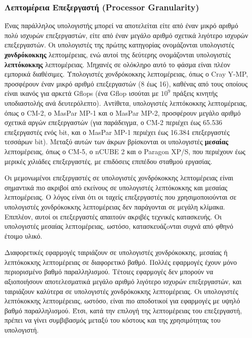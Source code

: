 \documentclass[12pt,a4paper]{article} %
\begin{document}
\subsubsection{Λεπτομέρεια Επεξεργαστή (Processor Granularity)}
Ένας παράλληλος υπολογιστής μπορεί να αποτελείται είτε από έναν μικρό 
αριθμό πολύ ισχυρών επεξεργαστών, είτε από έναν μεγάλο αριθμό σχετικά 
λιγότερο ισχυρών επεξεργαστών. Οι υπολογιστές της πρώτης κατηγορίας 
ονομάζονται υπολογιστές \textbf{χονδρόκοκκης} λεπτομέρειας, ενώ αυτοί της 
δεύτερης ονομάζονται υπολογιστές \textbf{λεπτόκοκκης} λεπτομέρειας. Μηχανές 
σε ολόκληρο αυτό το φάσμα είναι πλέον εμπορικά διαθέσιμες. Υπολογιστές 
χονδρόκοκκης λεπτομέρειας, όπως ο Cray Y-MP, 
προσφέρουν έναν μικρό αριθμό επεξεργαστών (8 έως 16), καθένας από τους 
οποίους είναι ικανός για αρκετά Gflops 
(ένα Gflop ισούται με $10^9$ πράξεις κινητής 
υποδιαστολής ανά δευτερόλεπτο). Αντίθετα, υπολογιστές λεπτόκοκκης 
λεπτομέρειας, όπως ο CM-2, ο 
MasPar MP-1 και ο MasPar MP-2,
προσφέρουν μεγάλο αριθμό σχετικά αργών επεξεργαστών (για παράδειγμα, ο 
CM-2 περιέχει έως 65.536 επεξεργαστές ενός 
bit, και ο MasPar MP-1 
περιέχει έως 16.384 επεξεργαστές τεσσάρων bit). 
Μεταξύ αυτών των άκρων βρίσκονται οι υπολογιστές \textbf{μεσαίας} λεπτομέρειας, 
όπως ο CM-5, ο nCUBE 2 
και ο Paragon XP/S, που περιέχουν έως μερικές 
χιλιάδες επεξεργαστές, με επιδόσεις επιπέδου σταθμού εργασίας.

Οι μεμονωμένοι επεξεργαστές σε υπολογιστές χονδρόκοκκης λεπτομέρειας 
είναι σημαντικά πιο ακριβοί από εκείνους σε υπολογιστές λεπτόκοκκης και 
μεσαίας λεπτομέρειας. Ο λόγος είναι ότι οι ταχείς επεξεργαστές που 
χρησιμοποιούνται σε υπολογιστές χονδρόκοκκης λεπτομέρειας δεν παράγονται 
σε μεγάλη κλίμακα. Επιπλέον, αυτοί οι επεξεργαστές απαιτούν ακριβές 
τεχνικές κατασκευής. Οι υπολογιστές μεσαίας λεπτομέρειας, ωστόσο, 
κατασκευάζoνται συχνά από φθηνό έτοιμο υλικό.

Διαφορετικές εφαρμογές ταιριάζουν σε υπολογιστές χονδρόκοκκης, μεσαίας ή
λεπτόκοκκης λεπτομέρειας σε διαφορετικό βαθμό. Πολλές εφαρμογές έχουν μόνο
περιορισμένο βαθμό παραλληλισμού. Τέτοιες εφαρμογές δεν μπορούν να αξιοποιήσουν
αποτελεσματικά μεγάλο αριθμό λιγότερο ισχυρών επεξεργαστών, και ταιριάζουν
καλύτερα σε υπολογιστές χονδρόκοκκης λεπτομέρειας. Οι υπολογιστές λεπτόκοκκης
λεπτομέρειας, ωστόσο, είναι πιο αποδοτικοί για εφαρμογές με υψηλό βαθμό
παραλληλισμού. Έτσι, κατά την επιλογή της λεπτομέρειας του επεξεργαστή, πρέπει να
γίνει συμβιβασμός μεταξύ του κόστους και της χρησιμότητας του υπολογιστή.
\end{document}
